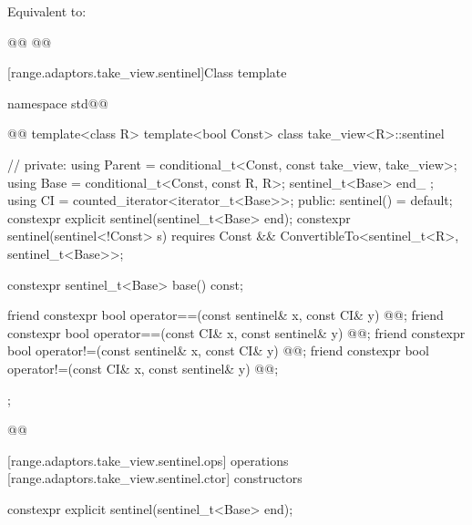 \begin{itemdescr}
\pnum
\effects Equivalent to:
\begin{codeblock}
@@
@@
\end{codeblock}
\end{itemdescr}

[range.adaptors.take_view.sentinel]{Class template }

\pnum
{}

\begin{codeblock}
namespace std@@ { @@
  template<class R>
  template<bool Const>
  class take_view<R>::sentinel { // \expos
  private:
    using Parent = conditional_t<Const, const take_view, take_view>;
    using Base = conditional_t<Const, const R, R>;
    sentinel_t<Base> end_ {};
    using CI = counted_iterator<iterator_t<Base>>;
  public:
    sentinel() = default;
    constexpr explicit sentinel(sentinel_t<Base> end);
    constexpr sentinel(sentinel<!Const> s)
      requires Const && ConvertibleTo<sentinel_t<R>, sentinel_t<Base>>;

    constexpr sentinel_t<Base> base() const;

    friend constexpr bool operator==(const sentinel& x, const CI& y)
      @@;
    friend constexpr bool operator==(const CI& x, const sentinel& y)
      @@;
    friend constexpr bool operator!=(const sentinel& x, const CI& y)
      @@;
    friend constexpr bool operator!=(const CI& x, const sentinel& y)
      @@;
  };
}@\oldtxt{\}}@
\end{codeblock}

[range.adaptors.take_view.sentinel.ops]{ operations}
[range.adaptors.take_view.sentinel.ctor]{ constructors}

\begin{itemdecl}
constexpr explicit sentinel(sentinel_t<Base> end);
\end{itemdecl}

